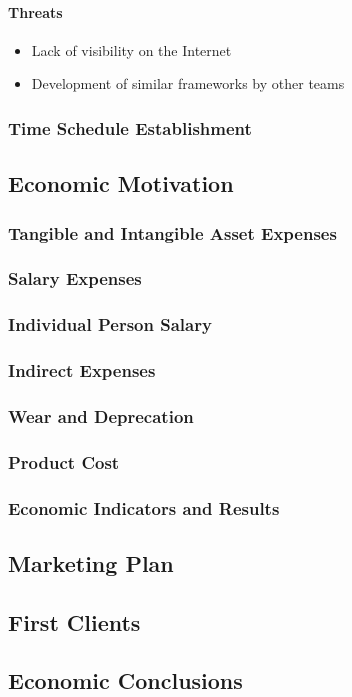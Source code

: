 \paragraph{Threats}

\begin{itemize}
    \item Lack of visibility on the Internet
    \item Development of similar frameworks by other teams
\end{itemize}

\subsubsection{Time Schedule Establishment}

\subsection{Economic Motivation}

\subsubsection{Tangible and Intangible Asset Expenses}

\subsubsection{Salary Expenses}

\subsubsection{Individual Person Salary}

\subsubsection{Indirect Expenses}

\subsubsection{Wear and Deprecation}

\subsubsection{Product Cost}

\subsubsection{Economic Indicators and Results}

\subsection{Marketing Plan}

\subsection{First Clients}

\subsection{Economic Conclusions}






\clearpage
